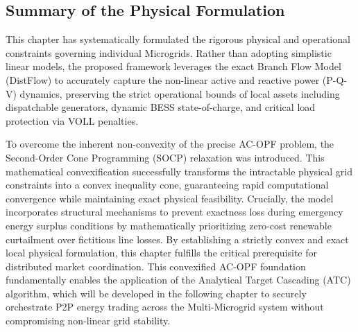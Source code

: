 \subsection{Summary of the Physical Formulation}

This chapter has systematically formulated the rigorous physical and operational constraints governing individual Microgrids. Rather than adopting simplistic linear models, the proposed framework leverages the exact Branch Flow Model (DistFlow) to accurately capture the non-linear active and reactive power (P-Q-V) dynamics, preserving the strict operational bounds of local assets including dispatchable generators, dynamic BESS state-of-charge, and critical load protection via VOLL penalties.

To overcome the inherent non-convexity of the precise AC-OPF problem, the Second-Order Cone Programming (SOCP) relaxation was introduced. This mathematical convexification successfully transforms the intractable physical grid constraints into a convex inequality cone, guaranteeing rapid computational convergence while maintaining exact physical feasibility. Crucially, the model incorporates structural mechanisms to prevent exactness loss during emergency energy surplus conditions by mathematically prioritizing zero-cost renewable curtailment over fictitious line losses. By establishing a strictly convex and exact local physical formulation, this chapter fulfills the critical prerequisite for distributed market coordination. This convexified AC-OPF foundation fundamentally enables the application of the Analytical Target Cascading (ATC) algorithm, which will be developed in the following chapter to securely orchestrate P2P energy trading across the Multi-Microgrid system without compromising non-linear grid stability.
